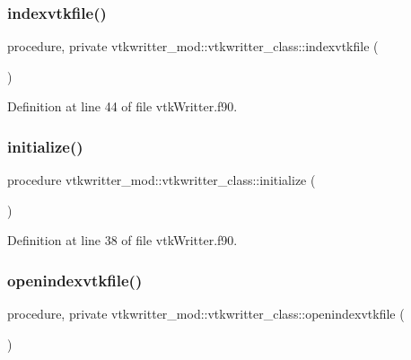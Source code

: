\subsubsection{\texorpdfstring{indexvtkfile()}{indexvtkfile()}}
{\footnotesize\ttfamily procedure, private vtkwritter\+\_\+mod\+::vtkwritter\+\_\+class\+::indexvtkfile (\begin{DoxyParamCaption}{ }\end{DoxyParamCaption})\hspace{0.3cm}{\ttfamily [private]}}



Definition at line 44 of file vtk\+Writter.\+f90.

\mbox{\label{structvtkwritter__mod_1_1vtkwritter__class_ad74a863969884dacf4c8d9b96088c6a6}} 
\subsubsection{\texorpdfstring{initialize()}{initialize()}}
{\footnotesize\ttfamily procedure vtkwritter\+\_\+mod\+::vtkwritter\+\_\+class\+::initialize (\begin{DoxyParamCaption}{ }\end{DoxyParamCaption})\hspace{0.3cm}{\ttfamily [private]}}



Definition at line 38 of file vtk\+Writter.\+f90.

\mbox{\label{structvtkwritter__mod_1_1vtkwritter__class_aab225b4fa3f3cd814f2760fe79bd426c}} 
\subsubsection{\texorpdfstring{openindexvtkfile()}{openindexvtkfile()}}
{\footnotesize\ttfamily procedure, private vtkwritter\+\_\+mod\+::vtkwritter\+\_\+class\+::openindexvtkfile (\begin{DoxyParamCaption}{ }\end{DoxyParamCaption})\hspace{0.3cm}{\ttfamily [private]}}




